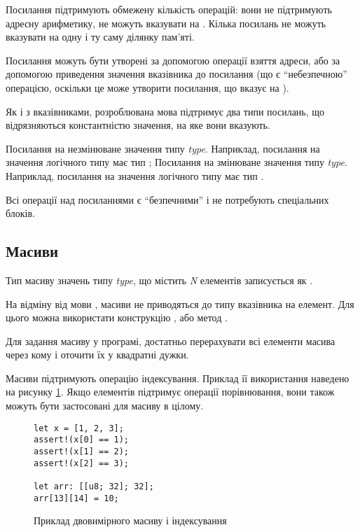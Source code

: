 \documentclass[main.tex]{subfiles}
\begin{document}
Посилання підтримують обмежену кількість операцій: вони не підтримують адресну арифметику, не можуть вказувати на . Кілька посилань не можуть вказувати на одну і ту саму ділянку пам'яті.

Посилання можуть бути утворені за допомогою операції взяття адреси, або за допомогою приведення значення вказівника до посилання (що є ``небезпечною'' операцією, оскільки це може утворити посилання, що вказує на ).

Як і з вказівниками, розроблювана мова підтримує два типи посилань, що відрязняються константністю значення, на яке вони вказують.
\begin{itemize}
Посилання на незмінюване значення типу \emph{type}.
Наприклад, посилання на значення логічного типу має тип ;
Посилання на змінюване значення типу \emph{type}.
Наприклад, посилання на значення логічного типу має тип .
\end{itemize}

Всі операції над посиланнями є ``безпечними'' і не потребують спеціальних блоків.

\FloatBarrier
\subsection{Масиви}
Тип масиву значень типу \emph{type}, що містить \emph{N} елементів записується як .

На відміну від мови \LangC{}, масиви не приводяться до типу вказівника на елемент. Для цього можна використати конструкцію , або метод .

Для задання масиву у програмі, достатньо перерахувати всі елементи масива через кому і оточити їх у квадратні дужки.

Масиви підтримують операцію індексування. Приклад її використання наведено на рисунку \ref{lang:array:access}. Якщо елементів підтримує операції порівнювання, вони також можуть бути застосовані для масиву в цілому.

\begin{figure}[h]
  \centering
  \begin{verbatim}
let x = [1, 2, 3];
assert!(x[0] == 1);
assert!(x[1] == 2);
assert!(x[2] == 3);

let arr: [[u8; 32]; 32];
arr[13][14] = 10;
  \end{verbatim}
  \caption{Приклад двовимірного масиву і індексування}
  \label{lang:array:access}
\end{figure}
\end{document}
